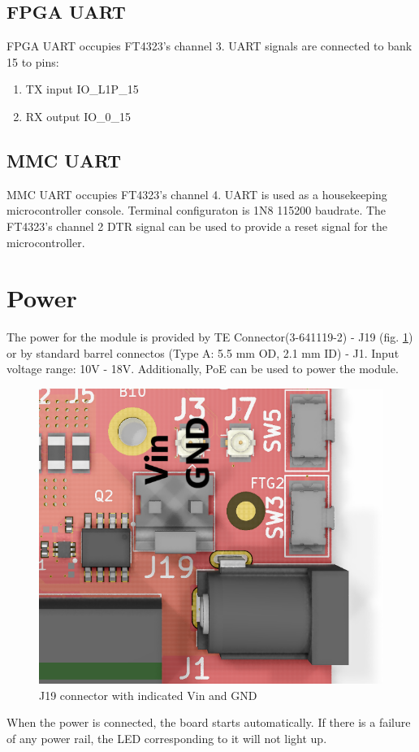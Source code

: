 \documentclass[12pt,oneside,a4]{article}
\begin{document}
\subsection{FPGA UART}
FPGA UART occupies FT4323's channel 3. UART signals are connected to bank 15 to pins:
\begin{enumerate}
	\item TX input IO\_L1P\_15 
	\item RX output IO\_0\_15
\end{enumerate}
\subsection{MMC UART}
MMC UART occupies FT4323's channel 4. UART is used as a housekeeping microcontroller console. Terminal configuraton is 1N8 115200 baudrate. The FT4323's channel 2 DTR signal can be used to provide a reset signal for the microcontroller.



\section{Power}
The power for the module is provided by TE Connector(3-641119-2) - J19 (fig. \ref{j19}) or by standard barrel connectos (Type A: 5.5 mm OD, 2.1 mm ID) - J1. Input voltage range: 10V - 18V. Additionally, PoE can be used to power the module.

\begin{figure}[H]
\begin{center}
\includegraphics[width=0.6\linewidth]{j1j19.png}
 \caption{J19 connector with indicated Vin and GND}\label{j19}
\end{center}
\end{figure}

When the power is connected, the board starts automatically. If there is a failure of any power rail, the LED corresponding to it will not light up. 
\end{document}
